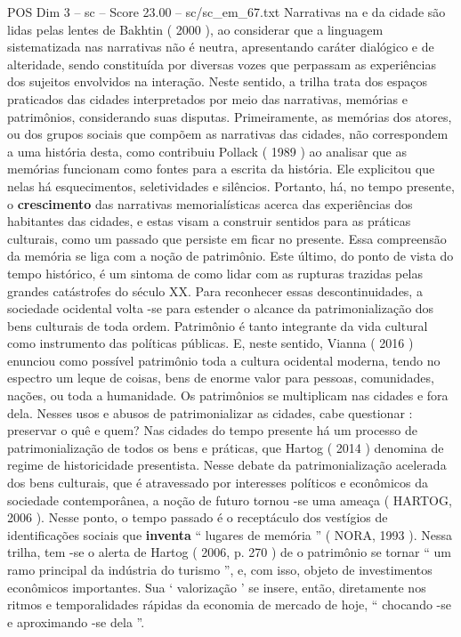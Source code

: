 \begin{textsample}{POS Dim 3 – sc – Score 23.00 – sc/sc\_em\_67.txt}
Narrativas na e da cidade são lidas pelas lentes de Bakhtin ( 2000 ), ao considerar que a linguagem sistematizada nas narrativas não é neutra, apresentando caráter dialógico e de alteridade, sendo constituída por diversas vozes que perpassam as experiências dos sujeitos envolvidos na interação.
Neste sentido, a trilha trata dos espaços praticados das cidades interpretados por meio das narrativas, memórias e patrimônios, considerando suas disputas.
Primeiramente, as memórias dos atores, ou dos grupos sociais que compõem as narrativas das cidades, não correspondem a uma história desta, como contribuiu Pollack ( 1989 ) ao analisar que as memórias funcionam como fontes para a escrita da história.
Ele explicitou que nelas há esquecimentos, seletividades e silêncios.
Portanto, há, no tempo presente, o \textbf{crescimento} das narrativas memorialísticas acerca das experiências dos habitantes das cidades, e estas visam a construir sentidos para as práticas culturais, como um passado que persiste em ficar no presente.
Essa compreensão da memória se liga com a noção de patrimônio.
Este último, do ponto de vista do tempo histórico, é um sintoma de como lidar com as rupturas trazidas pelas grandes catástrofes do século XX.
Para reconhecer essas descontinuidades, a sociedade ocidental volta -se para estender o alcance da patrimonialização dos bens culturais de toda ordem.
Patrimônio é tanto integrante da vida cultural como instrumento das políticas públicas.
E, neste sentido, Vianna ( 2016 ) enunciou como possível patrimônio toda a cultura ocidental moderna, tendo no espectro um leque de coisas, bens de enorme valor para pessoas, comunidades, nações, ou toda a humanidade.
Os patrimônios se multiplicam nas cidades e fora dela.
Nesses usos e abusos de patrimonializar as cidades, cabe questionar : preservar o quê e quem?
Nas cidades do tempo presente há um processo de patrimonialização de todos os bens e práticas, que Hartog ( 2014 ) denomina de regime de historicidade presentista.
Nesse debate da patrimonialização acelerada dos bens culturais, que é atravessado por interesses políticos e econômicos da sociedade contemporânea, a noção de futuro tornou -se uma ameaça ( HARTOG, 2006 ).
Nesse ponto, o tempo passado é o receptáculo dos vestígios de identificações sociais que \textbf{inventa} “ lugares de memória ” ( NORA, 1993 ).
Nessa trilha, tem -se o alerta de Hartog ( 2006, p. 270 ) de o patrimônio se tornar “ um ramo principal da indústria do turismo ”, e, com isso, objeto de investimentos econômicos importantes.
Sua ‘ valorização ’ se insere, então, diretamente nos ritmos e temporalidades rápidas da economia de mercado de hoje, “ chocando -se e aproximando -se dela ”.

\end{textsample}
